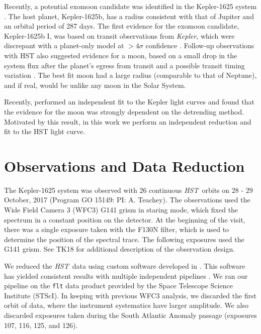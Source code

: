 \documentclass[twocolumn]{aastex62}
\newcommand{\project}[1]{\textsl{#1}}
\newcommand{\HST}{\project{HST}}
\newcommand{\Kepler}{\project{Kepler}}
\begin{document}
Recently, a potential exomoon candidate was identified in the Kepler-1625 system \citep{teachey18a}. The host planet, Kepler-1625b, has a radius consistent with that of Jupiter and an orbital period of 287 days.  The first evidence for the exomoon candidate, Kepler-1625b I, was based on transit observations from \Kepler, which were discrepant with a planet-only model at $>4\sigma$ confidence \citep{teachey18a}. Follow-up observations with HST also suggested evidence for a moon, based on a small drop in the system flux after the planet's egress from transit and a possible transit timing variation \citep[][ hereafter TK18]{teachey18b}. The best fit moon had a large radius (comparable to that of Neptune), and if real, would be unlike any moon in the Solar System.

Recently, \cite{rodenbeck18} performed an independent fit to the Kepler light curves and found that the evidence for the moon was strongly dependent on the detrending method. Motivated by this result, in this work we perform an independent reduction and fit to the HST light curve.





\section{Observations and Data Reduction} \label{sec:data}
The Kepler-1625 system was observed with 26 continuous \HST\ orbits on 28 - 29 October, 2017 (Program GO 15149: PI: A. Teachey). The observations used the Wide Field Camera 3 (WFC3) G141 grism in staring mode, which fixed the spectrum in a constant position on the detector.  At the beginning of the visit, there was a single exposure taken with the F130N filter, which is used to determine the position of the spectral trace. The following exposures used the G141 grism.  See TK18 for additional description of the observation design.


We reduced the \HST\ data using custom software developed in \cite{kreidberg14a}.  This software has yielded consistent results with multiple independent pipelines \citep[e.g.][]{knutson14b, spake18}.  We ran our pipeline on the \texttt{flt} data product provided by the Space Telescope Science Institute (STScI).  In keeping with previous WFC3 analysis, we discarded the first orbit of data, where the instrument systematics have larger amplitude. We also discarded exposures taken during the South Atlantic Anomaly passage (exposures 107, 116, 125, and 126).
\end{document}
